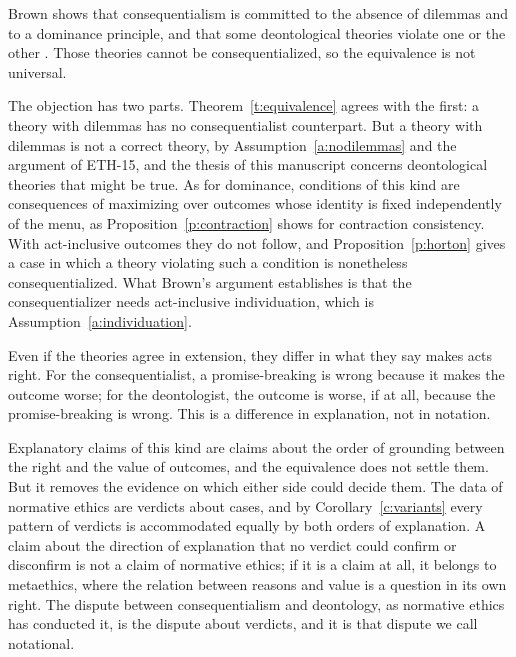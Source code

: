 \documentclass{situationist-preprint}
\begin{document}
\begin{objection}
Brown shows that consequentialism is committed to the absence of dilemmas and to a dominance principle, and that some deontological theories violate one or the other \citep{Brown2011}. Those theories cannot be consequentialized, so the equivalence is not universal.
\end{objection}

\begin{reply}
The objection has two parts. Theorem~\ref{t:equivalence} agrees with the first: a theory with dilemmas has no consequentialist counterpart. But a theory with dilemmas is not a correct theory, by Assumption~\ref{a:nodilemmas} and the argument of ETH-15, and the thesis of this manuscript concerns deontological theories that might be true. As for dominance, conditions of this kind are consequences of maximizing over outcomes whose identity is fixed independently of the menu, as Proposition~\ref{p:contraction} shows for contraction consistency. With act-inclusive outcomes they do not follow, and Proposition~\ref{p:horton} gives a case in which a theory violating such a condition is nonetheless consequentialized. What Brown's argument establishes is that the consequentializer needs act-inclusive individuation, which is Assumption~\ref{a:individuation}.
\end{reply}

\begin{objection}
Even if the theories agree in extension, they differ in what they say makes acts right. For the consequentialist, a promise-breaking is wrong because it makes the outcome worse; for the deontologist, the outcome is worse, if at all, because the promise-breaking is wrong. This is a difference in explanation, not in notation.
\end{objection}

\begin{reply}
Explanatory claims of this kind are claims about the order of grounding between the right and the value of outcomes, and the equivalence does not settle them. But it removes the evidence on which either side could decide them. The data of normative ethics are verdicts about cases, and by Corollary~\ref{c:variants} every pattern of verdicts is accommodated equally by both orders of explanation. A claim about the direction of explanation that no verdict could confirm or disconfirm is not a claim of normative ethics; if it is a claim at all, it belongs to metaethics, where the relation between reasons and value is a question in its own right. The dispute between consequentialism and deontology, as normative ethics has conducted it, is the dispute about verdicts, and it is that dispute we call notational.
\end{reply}
\end{document}
